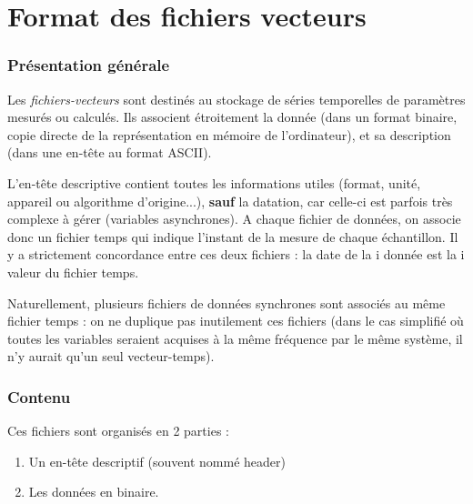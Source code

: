 
\part{Format des fichiers vecteurs}
\label{part:formvec}
\section{Présentation générale}
  Les \emph{fichiers-vecteurs} sont destinés au stockage de séries
temporelles de paramètres mesurés ou calculés. Ils associent
étroitement la donnée (dans un format binaire,
copie directe de la représentation en mémoire de
l'ordinateur), et sa description (dans une en-tête au format ASCII).

  L'en-tête descriptive contient toutes les informations
utiles (format, unité, appareil ou algorithme d'origine...), \textbf{sauf}
la datation, car celle-ci
est parfois très complexe à gérer (variables
asynchrones). A chaque fichier de données, on associe donc un fichier
temps qui indique l'instant de la mesure de chaque
échantillon. Il y a strictement concordance entre ces deux fichiers :
la date de la i donnée est la i
valeur du fichier temps.

      Naturellement, plusieurs fichiers de données
synchrones sont associés au même fichier \og temps\fg{} : on
ne duplique pas inutilement ces fichiers (dans le cas simplifié
où toutes les variables seraient acquises à la même
fréquence par le même système, il n'y aurait qu'un seul vecteur-temps).

\section{Contenu}

Ces fichiers sont organisés en 2 parties :
\begin{enumerate}
  \item Un en-tête descriptif (souvent nommé \og header\fg{})
  \item Les données en binaire.
\end{enumerate}

